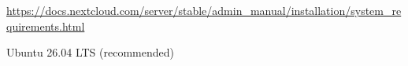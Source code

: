 \url{https://docs.nextcloud.com/server/stable/admin_manual/installation/system_requirements.html}

Ubuntu 26.04 LTS (recommended)
